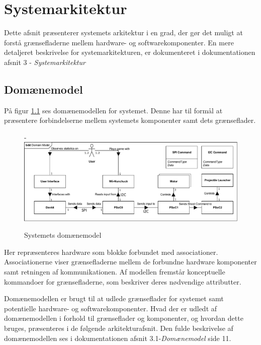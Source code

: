 \chapter{Systemarkitektur}
Dette afsnit præsenterer systemets arkitektur i en grad, der gør det muligt at forstå grænsefladerne mellem hardware- og softwarekomponenter. En mere detaljeret beskrivelse for systemarkitekturen, er dokumenteret i dokumentationen afsnit 3 - \textit{Systemarkitektur}

\section{Domænemodel}
På figur \ref{figure:domainModel} ses domænemodellen for systemet. Denne har til formål at præsentere forbindelserne mellem systemets komponenter samt dets grænseflader.

\begin{figure}[H]
	\begin{adjustwidth}{-2cm}{-\rightmargin}
		\centering
		\includegraphics[width=0.75\paperwidth]{SystemArkitektur/images/domainModel}
		\caption{Systemets domænemodel}
		\label{figure:domainModel}
	\end{adjustwidth}
\end{figure}

\noindent Her repræsenteres hardware som blokke forbundet med associationer. Associationerne viser grænsefladerne mellem de forbundne hardware komponenter samt retningen af kommunikationen. Af modellen fremstår konceptuelle kommandoer for grænsefladerne, som beskriver deres nødvendige attributter. \newline

\noindent Domænemodellen er brugt til at udlede grænseflader for systemet samt potentielle hardware- og softwarekomponenter. Hvad der er udledt af domænemodellen i forhold til grænseflader og komponenter, og hvordan dette bruges, præsenteres i de følgende arkitekturafsnit. Den fulde beskrivelse af domænemodellen ses i dokumentationen afsnit 3.1-\textit{Domænemodel} side 11.

